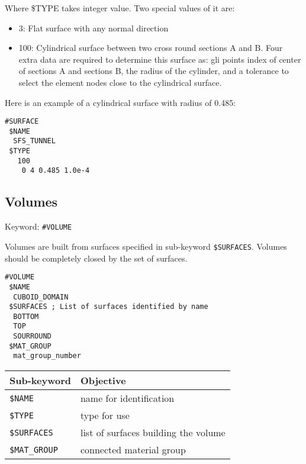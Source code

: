 Where \$TYPE takes integer value. Two special values of it are:
\begin{itemize}
    \item 3: Flat surface with any normal direction
    \item 100: Cylindrical surface between two cross round
    sections A and B. Four extra data are required to determine
    this surface as:
    gli points index of center of sections A and sections B, the
    radius of the cylinder, and a tolerance to select the element
    nodes close to the cylindrical surface.
\end{itemize}

Here is an example of a cylindrical surface with radius of 0.485:
 \small
\begin{verbatim}
#SURFACE
 $NAME
  SFS_TUNNEL
 $TYPE
   100
    0 4 0.485 1.0e-4
\end{verbatim}
\normalsize


\subsection{Volumes}

Keyword: \texttt{\#VOLUME}

Volumes are built from surfaces specified in sub-keyword
\texttt{\$SURFACES}. Volumes should be completely closed by the
set of surfaces.

\small
\begin{verbatim}
#VOLUME
 $NAME
  CUBOID_DOMAIN
 $SURFACES ; List of surfaces identified by name
  BOTTOM
  TOP
  SOURROUND
 $MAT_GROUP
  mat_group_number
\end{verbatim}
\normalsize

\begin{center}
\begin{tabular}{|l|l|}
\hline
Sub-keyword & Objective \\
\hline \hline
%
\texttt{\$NAME}    &  name for identification \\
\texttt{\$TYPE}    &  type for use \\
\texttt{\$SURFACES}  &  list of surfaces building the volume \\
\texttt{\$MAT\_GROUP}   &  connected material group \\
\hline
\end{tabular}
\end{center}

\vfill {}
